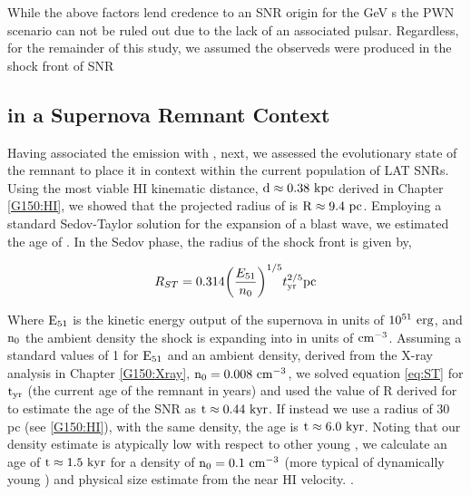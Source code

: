 While the above factors lend credence to an SNR origin for the GeV \gam{}s the PWN  scenario can not be ruled out due to the lack of an associated pulsar. Regardless, for the remainder of this study, we assumed the observed\gam{}s were produced in the shock front of SNR \Gone{}

\subsection{\Gone{} in a Supernova Remnant Context }\label{G150:SNRevo}

Having associated the \gam{} emission with \Gone{}, next, we assessed the evolutionary state of the remnant to place it in context within the current population of LAT SNRs. Using the most viable HI kinematic distance, ${\rm d  \approx 0.38~kpc}$ derived in Chapter \ref{G150:HI}, we showed that the projected radius of \Gone{} is ${\rm R \approx 9.4~pc}$. Employing a standard Sedov-Taylor solution for the expansion of a blast wave, we estimated the age of \Gone{}. In the Sedov phase, the radius of the shock front is given by,


\begin{equation} \label{eq:ST}
	R_{ST} = 0.314 \bigg{(}\frac{E_{51}}{n_0} \bigg{)}^{1/5} t_{{\rm yr}}^{2/5} {\rm  pc}
\end{equation}

Where ${\rm E_{51}}$ is the kinetic energy output of the  supernova in units of ${\rm 10^{51}~erg}$, and ${\rm n_0}$ the ambient density the shock is expanding into in units of ${\rm cm^{-3}}$. Assuming a standard values of 1 for ${\rm E_{51}}$ and an ambient density, derived from the X-ray analysis in Chapter \ref{G150:Xray}, ${\rm n_0 = 0.008~cm^{-3}}$, we solved equation \ref{eq:ST} for ${\rm t_{yr}}$ (the current age of the remnant in years) and used the value of R derived for \Gone{} to estimate the age of the SNR as ${\rm t \approx 0.44~kyr}$. If instead we use a radius of 30 pc (see \ref{G150:HI}), with the same density, the age is ${\rm t \approx 6.0~kyr}$. Noting that our density estimate is atypically low with respect to other young \snrs{}, we calculate an age of ${\rm t \approx 1.5~kyr}$ for a density of ${\rm n_0 = 0.1~cm^{-3}}$ (more typical of dynamically young \snrs{}) and physical size estimate from the near HI velocity.
.%

